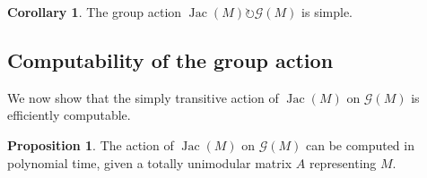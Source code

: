 \documentclass[12pt]{amsart}
\numberwithin{equation}{section}
\theoremstyle{definition}
\newtheorem{corollary}[theorem]{Corollary}
\newtheorem{proposition}[theorem]{Proposition}
\newcommand{\Jac}{\operatorname{Jac}}
\begin{document}
\begin{corollary} \label{Prop:SimpleTorsor}
The group action $\Jac(M)\circlearrowright\mathcal{G}(M)$ is simple.
\end{corollary}



\subsection{Computability of the group action}\label{computingstuff}

We now show that the simply transitive action of $\Jac(M)$ on ${\mathcal G}(M)$ is efficiently computable.

\begin{proposition} \label{prop:groupactioncomputable}
The action of $\Jac(M)$ on ${\mathcal G}(M)$ can be computed in polynomial time, given a totally unimodular matrix $A$ representing $M$.
\end{proposition}
\end{document}
